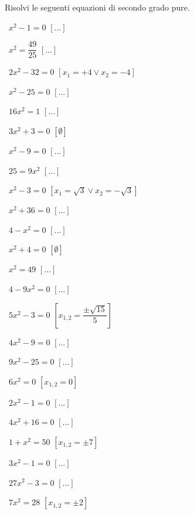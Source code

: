 \begin{esercizio}[\Ast]
 \label{ese:3.1}
Risolvi le seguenti equazioni di secondo grado pure.
\begin{multicols}{2}
 \begin{enumeratea}
 \item~\(x^{2}-1 = 0\) \hfill\(\left[...\right]\)
 \item~\(x^{2}=\dfrac{49}{25}\) \hfill\(\left[...\right]\)
 \item~\(2x^{2} - 32 = 0\) \hfill\(\left[x_{1}=+4 \vee x_{2}=-4\right]\)
 \item~\(x^{2}-25=0\) \hfill\(\left[...\right]\)
 \item~\(16 x^{2}=1\) \hfill\(\left[...\right]\)
 \item~\(3x^{2}+3=0\) \hfill\(\left[\emptyset\right]\)
 \item~\(x^{2}-9=0\) \hfill\(\left[...\right]\)
 \item~\(25=9 x^{2}\) \hfill\(\left[...\right]\)
 \item~\(x^{2} - 3 = 0\) \hfill\(\left[x_{1} = \sqrt{3} \vee x _{2} = - 
\sqrt{3}\right]\)
 \item~\(x^{2} + 36 = 0\) \hfill\(\left[...\right]\)
 \item~\(4 - x^{2} = 0\) \hfill\(\left[...\right]\)
 \item~\(x^{2} + 4 = 0\) \hfill\(\left[\emptyset\right]\)
 \item~\(x^{2} = 49\) \hfill\(\left[...\right]\)
 \item~\(4 - 9 x^{2} = 0\) \hfill\(\left[...\right]\)
 \item~\(5 x^{2} - 3 = 0\) \hfill\(\left[x_{1,2} = \dfrac{\pm 
\sqrt{15}}{5}\right]\)
 \item~\(4 x^{2} - 9 = 0\) \hfill\(\left[...\right]\)
 \item~\(9 x^{2} - 25 = 0\) \hfill\(\left[...\right]\)
 \item~\(6 x^{2} = 0\) \hfill\(\left[x_{1,2} = 0\right]\)
 \item~\(2 x^{2} - 1 = 0\) \hfill\(\left[...\right]\)
 \item~\(4 x^{2} + 16 = 0\) \hfill\(\left[...\right]\)
 \item~\(1 + x^{2} = 50\) \hfill\(\left[x_{1,2} = \pm 7\right]\)
 \item~\(3 x^{2} - 1 = 0\) \hfill\(\left[...\right]\)
 \item~\(27 x^{2} - 3 = 0\) \hfill\(\left[...\right]\)
 \item~\(7 x^{2} = 28\) \hfill\(\left[x_{1,2} = \pm 2\right]\)
 \end{enumeratea}
 \end{multicols}
\end{esercizio}

